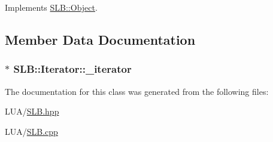 Implements \hyperlink{classSLB_1_1Object_a3dddf6a764c19ed37f6af797f0b0b453}{S\+L\+B\+::\+Object}.



\subsection{Member Data Documentation}
\subsubsection[{\texorpdfstring{\+\_\+iterator}{_iterator}}]{$\ast$ S\+L\+B\+::\+Iterator\+::\+\_\+iterator\hspace{0.3cm}{\ttfamily [private]}}\hypertarget{classSLB_1_1Iterator_ad59c3ab50c188ea80fb571831ac11369}{}\label{classSLB_1_1Iterator_ad59c3ab50c188ea80fb571831ac11369}


The documentation for this class was generated from the following files\+:\begin{DoxyCompactItemize}
\item 
L\+U\+A/\hyperlink{SLB_8hpp}{S\+L\+B.\+hpp}\item 
L\+U\+A/\hyperlink{SLB_8cpp}{S\+L\+B.\+cpp}\end{DoxyCompactItemize}
